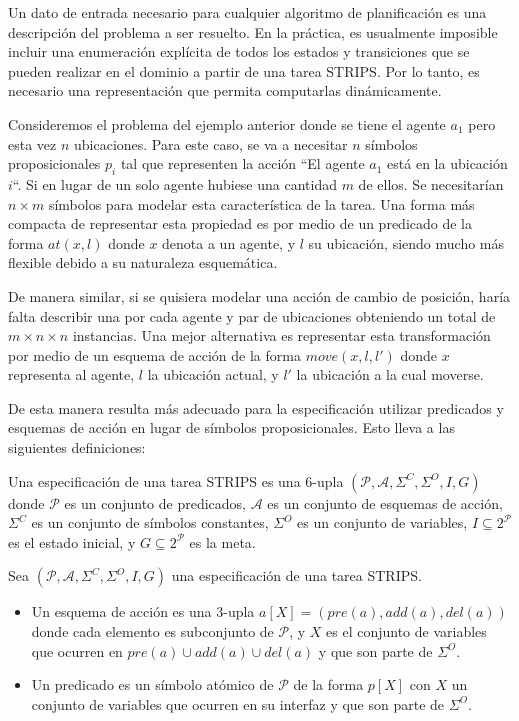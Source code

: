 Un dato de entrada necesario para cualquier algoritmo de planificación es una
descripción del problema a ser resuelto. En la práctica, es usualmente imposible
incluir una enumeración explícita de todos los estados y transiciones que se
pueden realizar en el dominio a partir de una tarea STRIPS. Por lo tanto, es
necesario una representación que permita computarlas dinámicamente.

Consideremos el problema del ejemplo anterior donde se tiene el agente $a_1$
pero esta vez $n$ ubicaciones. Para este caso, se va a necesitar $n$ símbolos
proposicionales $p_i$ tal que representen la acción ``El agente $a_1$ está en la
ubicación $i$``. Si en lugar de un solo agente hubiese una cantidad $m$ de
ellos. Se necesitarían $n \times m$ símbolos para modelar esta característica de
la tarea. Una forma más compacta de representar esta propiedad es por medio de
un predicado de la forma $at(x, l)$ donde $x$ denota a un agente, y $l$ su
ubicación, siendo mucho más flexible debido a su naturaleza esquemática.

De manera similar, si se quisiera modelar una acción de cambio de posición,
haría falta describir una por cada agente y par de ubicaciones obteniendo un
total de $m \times n \times n$ instancias. Una mejor alternativa es representar
esta transformación por medio de un esquema de acción de la forma $move(x, l,
l')$ donde $x$ representa al agente, $l$ la ubicación actual, y $l'$ la ubicación
a la cual moverse.

De esta manera resulta más adecuado para la especificación utilizar predicados y
esquemas de acción en lugar de símbolos proposicionales. Esto lleva a las
siguientes definiciones:

\begin{mydef}
    Una especificación de una tarea STRIPS es una 6-upla $(\mathcal{P},
    \mathcal{A}, \Sigma^{C}, \Sigma^{O}, I, G)$  donde $\mathcal{P}$ es un
    conjunto de predicados, $\mathcal{A}$ es un conjunto de esquemas de acción,
    $\Sigma^{C}$ es un conjunto de símbolos constantes, $\Sigma^{O}$ es un conjunto de 
    variables, $I \subseteq 2^{\mathcal{P}}$ es el estado inicial, y $G \subseteq 2^{\mathcal{P}}$
    es la meta.
\end{mydef}

\begin{mydef}
    Sea $(\mathcal{P}, \mathcal{A}, \Sigma^{C}, \Sigma^{O}, I, G)$ una
    especificación de una tarea STRIPS.

    \begin{itemize}
        \item Un esquema de acción es una 3-upla $a[X] = (pre(a), add(a),
        del(a))$ donde cada elemento es subconjunto de $\mathcal{P}$, y $X$ es el
        conjunto de variables que ocurren en $pre(a) \cup add(a) \cup del(a)$ y
        que son parte de $\Sigma^{O}$.
        \item Un predicado es un símbolo atómico de $\mathcal{P}$ de la forma
        $p[X]$ con $X$ un conjunto de variables que ocurren en su interfaz y
        que son parte de $\Sigma^{O}$.
    \end{itemize}
\end{mydef}

